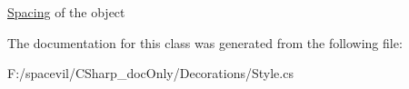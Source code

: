 \mbox{\hyperlink{struct_space_v_i_l_1_1_decorations_1_1_spacing}{Spacing}} of the object 



The documentation for this class was generated from the following file\+:\begin{DoxyCompactItemize}
\item 
F\+:/spacevil/\+C\+Sharp\+\_\+doc\+Only/\+Decorations/Style.\+cs\end{DoxyCompactItemize}
